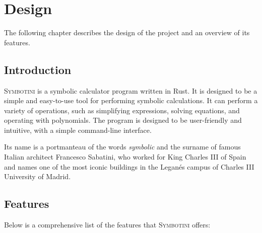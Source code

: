 \chapter{Design}\label{chap:design}

The following chapter describes the design of the project and an overview of its features.

\section{Introduction}\label{sec:introduction}

\textsc{Symbotini} is a symbolic calculator program written in Rust. It is designed to be a simple and easy-to-use tool for performing symbolic calculations. It can perform a variety of operations, such as simplifying expressions, solving equations, and operating with polynomials. The program is designed to be user-friendly and intuitive, with a simple command-line interface.

Its name is a portmanteau of the words \textit{symbolic} and the surname of famous Italian architect Francesco Sabatini, who worked for King Charles III of Spain and names one of the most iconic buildings in the Leganés campus of Charles III University of Madrid.

\section{Features}\label{sec:features}

Below is a comprehensive list of the features that \textsc{Symbotini} offers:

